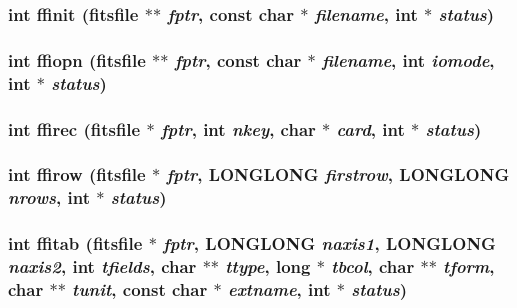 \subsubsection{\setlength{\rightskip}{0pt plus 5cm}int ffinit (\bf{fitsfile} $\ast$$\ast$ {\em fptr}, const char $\ast$ {\em filename}, int $\ast$ {\em status})}\label{test_2roimasker_2fitsio_8h_7bcc7eb7ff6f0bf2ab7f40cc161b6dc0}


\subsubsection{\setlength{\rightskip}{0pt plus 5cm}int ffiopn (\bf{fitsfile} $\ast$$\ast$ {\em fptr}, const char $\ast$ {\em filename}, int {\em iomode}, int $\ast$ {\em status})}\label{test_2roimasker_2fitsio_8h_825f4f914579c653cdaf72db6073e325}


\subsubsection{\setlength{\rightskip}{0pt plus 5cm}int ffirec (\bf{fitsfile} $\ast$ {\em fptr}, int {\em nkey}, char $\ast$ {\em card}, int $\ast$ {\em status})}\label{test_2roimasker_2fitsio_8h_edb502cbbb6efbbaf1eecbfbd97b64ef}


\subsubsection{\setlength{\rightskip}{0pt plus 5cm}int ffirow (\bf{fitsfile} $\ast$ {\em fptr}, \bf{LONGLONG} {\em firstrow}, \bf{LONGLONG} {\em nrows}, int $\ast$ {\em status})}\label{test_2roimasker_2fitsio_8h_cc0bcaad639ee0a73351ad70a6079504}


\subsubsection{\setlength{\rightskip}{0pt plus 5cm}int ffitab (\bf{fitsfile} $\ast$ {\em fptr}, \bf{LONGLONG} {\em naxis1}, \bf{LONGLONG} {\em naxis2}, int {\em tfields}, char $\ast$$\ast$ {\em ttype}, long $\ast$ {\em tbcol}, char $\ast$$\ast$ {\em tform}, char $\ast$$\ast$ {\em tunit}, const char $\ast$ {\em extname}, int $\ast$ {\em status})}\label{test_2roimasker_2fitsio_8h_b6becfd4402c4a582805481af85095db}


